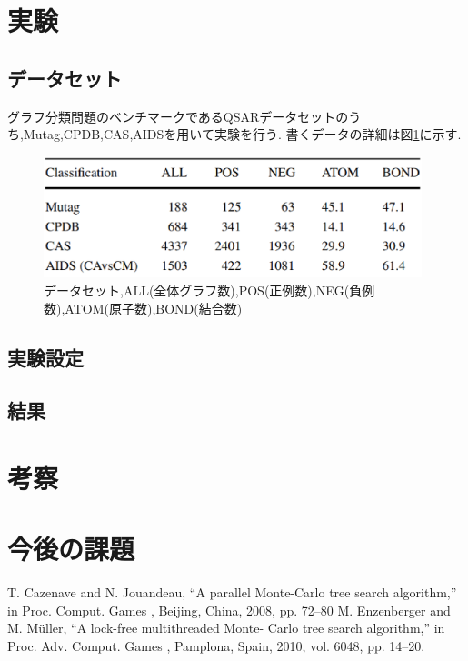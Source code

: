 \documentclass{zasshi-prml3}
\theoremstyle{definition}
\begin{document}
\section{実験}
\subsection{データセット}
グラフ分類問題のベンチマークであるQSARデータセットのうち,Mutag,CPDB,CAS,AIDSを用いて実験を行う.
書くデータの詳細は図\ref{datasets}に示す.
\begin{figure}[t]
	\centering
	\includegraphics[width=110mm]{figure/datasets.png}
	\caption{データセット,ALL(全体グラフ数),POS(正例数),NEG(負例数),ATOM(原子数),BOND(結合数)}
	\label{datasets}
\end{figure}

\subsection{実験設定}

\subsection{結果}

\section{考察}

\section{今後の課題}

\begin{thebibliography}{9}
T. Cazenave and N. Jouandeau, “A
parallel Monte-Carlo tree search
algorithm,” in
Proc. Comput. Games
, Beijing, China, 2008, pp. 72–80
M. Enzenberger and M. Müller, “A
lock-free multithreaded Monte-
Carlo tree search algorithm,” in
Proc. Adv. Comput. Games
, Pamplona,
Spain, 2010, vol. 6048, pp. 14–20.
\end{thebibliography}
\end{document}
